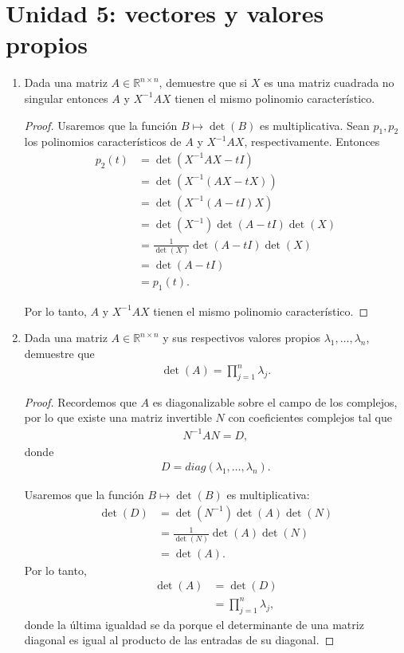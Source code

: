 \documentclass{article}
\theoremstyle{definition}
\newcommand{\R}{\mathbb{R}}
\begin{document}
\section*{Unidad 5: vectores y valores propios}

\begin{enumerate}
	\item Dada una matriz $A \in \R^{n \times n}$, demuestre que si $X$ es una matriz cuadrada no singular entonces $A$ y $X^{-1} A X$ tienen el mismo polinomio característico.
	
	\begin{proof}
		Usaremos que la función  $B \mapsto \det(B)$ es multiplicativa. Sean $p_1,p_2$ los polinomios característicos de $A$ y $X^{-1}AX$, respectivamente. Entonces
		\begin{align}
			p_2 (t) & = \det ( X^{-1}AX - tI) \\
			& = \det( X^{-1} ( AX - t X)) \\
			& = \det( X^{-1} ( A - tI) X) \\
			& = \det (X^{-1}) \det (A -tI) \det(X) \\
			& = \frac{1}{\det (X)} \det (A-tI) \det( X) \\
			& = \det (A-tI) \\
			&  = p_1 (t).
		\end{align}
		
	Por lo tanto, $A$ y $X^{-1}AX$ tienen el mismo polinomio característico.
	\end{proof}
	
\item  Dada una matriz $A \in \R^{n \times n}$ y sus respectivos valores propios $\lambda_1, \dots ,\lambda_n$, demuestre que
	\begin{align}
		\det (A ) = \prod _{j=1}^n \lambda_j.
	\end{align}
	
	\begin{proof}
		Recordemos que $A$ es diagonalizable sobre el campo de los complejos, por lo que existe una matriz invertible $N$ con coeficientes complejos tal que
			\begin{align}
				N^{-1}AN = D,
			\end{align}
		donde
			\begin{align}
				D  = diag(\lambda_1, \dots, \lambda_n).
			\end{align}
			
		Usaremos que la función $B \mapsto \det (B)$ es multiplicativa:
			\begin{align}
				\det (D) & = \det ( N^{-1}) \det (A) \det (N) \\
				& = \frac{1}{\det(N)} \det (A) \det (N) \\
				& = \det (A).
			\end{align}
		Por lo tanto, 
			\begin{align}
				\det (A) & =   \det(D) \\
				& = \prod_{j=1}^n \lambda_j,
			\end{align}
		donde la última igualdad se da porque el determinante de una matriz diagonal es igual al producto de las entradas de su diagonal.
	\end{proof}
	

\end{enumerate}
\end{document}
